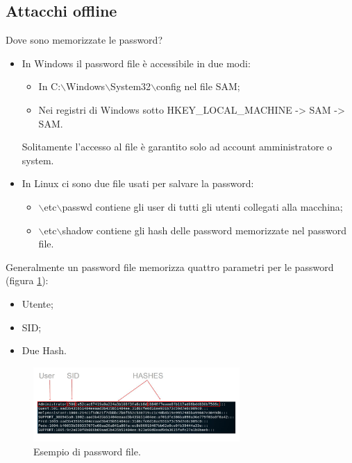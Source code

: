 \subsection{Attacchi offline}
Dove sono memorizzate le password?
\begin{itemize}
    \item In Windows il password file è accessibile in due modi: 
    	\begin{itemize}
    	    \item In C:$\backslash$Windows$\backslash$System32$\backslash$config nel file SAM;
    	    \item Nei registri di Windows sotto HKEY\_LOCAL\_MACHINE -> SAM -> SAM. 
    	\end{itemize}
     \noindent Solitamente l'accesso al file è garantito solo ad account amministratore o system.
    \item In Linux ci sono due file usati per salvare la password:
    	\begin{itemize}
    	    \item $\backslash$etc$\backslash$passwd contiene gli user di tutti gli utenti collegati alla macchina;
        	\item $\backslash$etc$\backslash$shadow contiene gli hash delle password memorizzate nel password file.
    	\end{itemize}
\end{itemize}

\noindent Generalmente un password file memorizza quattro parametri per le password (figura \ref{fig:7-1}):
\begin{itemize}
    \item Utente;
    \item SID;
    \item Due Hash.
\end{itemize}

\begin{figure}
    \centering
    \includegraphics[width=0.7\textwidth]{images/7-1.png}
    \caption{Esempio di password file.}
    \label{fig:7-1}
\end{figure}

